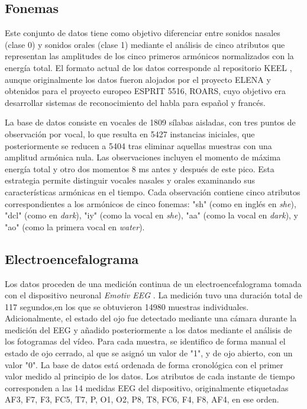 \subsection{Fonemas}

Este conjunto de datos tiene como objetivo diferenciar entre sonidos nasales (clase 0) y sonidos orales (clase 1) mediante el análisis de cinco atributos que representan las amplitudes de los cinco primeros armónicos normalizados con la energía total. El formato actual de los datos corresponde al repositorio KEEL \cite{keel-repo}, aunque originalmente los datos fueron alojados por el proyecto ELENA y obtenidos para el proyecto europeo ESPRIT 5516, ROARS, cuyo objetivo era desarrollar sistemas de reconocimiento del habla para español y francés.

La base de datos consiste en vocales de 1809 sílabas aisladas, con tres puntos de observación por vocal, lo que resulta en 5427 instancias iniciales, que posteriormente se reducen a 5404 tras eliminar aquellas muestras con una amplitud armónica nula. Las observaciones incluyen el momento de máxima energía total y otro dos momentos 8 ms antes y después de este pico. Esta estrategia permite distinguir vocales nasales y orales examinando sus características armónicas en el tiempo. Cada observación contiene cinco atributos correspondientes a los armónicos de cinco fonemas: "sh" (como en inglés en \emph{she}), "dcl" (como en \emph{dark}), "iy" (como la vocal en \emph{she}), "aa" (como la vocal en \emph{dark}), y "ao" (como la primera vocal en \emph{water}).

\subsection{Electroencefalograma}

Los datos proceden de una medición continua de un electroencefalograma tomada con el dispositivo neuronal \emph{Emotiv EEG} \cite{eeg-eye-dataset}. La medición tuvo una duración total de 117 segundos,en los que se obtuvieron 14980 muestras individuales. Adicionalmente, el estado del ojo fue detectado mediante una cámara durante la medición del EEG y añadido posteriormente a los datos mediante el análisis de los fotogramas del vídeo. Para cada muestra, se identifico de forma manual el estado de ojo cerrado, al que se asignó un valor de "1", y de ojo abierto, con un valor "0". La base de datos está ordenada de forma cronológica con el primer valor medido al principio de los datos. Los atributos de cada instante de tiempo corresponden a las 14 medidas EEG del dispositivo, originalmente etiquetadas AF3, F7, F3, FC5, T7, P, O1, O2, P8, T8, FC6, F4, F8, AF4, en ese orden.

